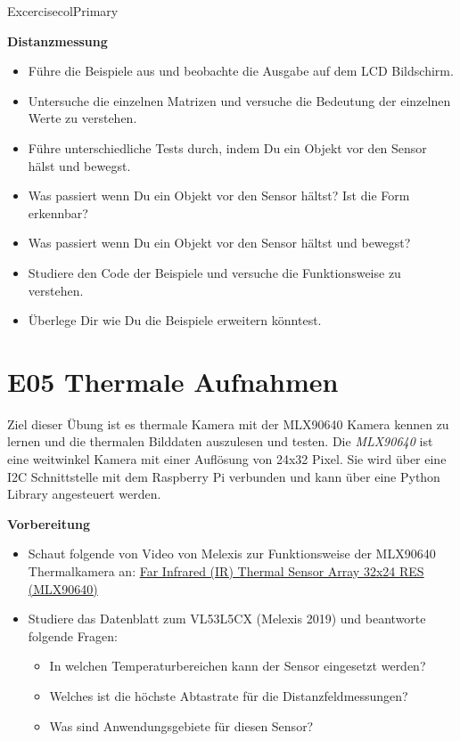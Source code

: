 \documentclass[
  11pt,
  a4paper,
  oneside, openany  ,captions=tableheading
]{scrbook}
\providecommand{\tightlist}{%
  \setlength{\itemsep}{0pt}\setlength{\parskip}{0pt}}
\theoremstyle{remark}
\begin{document}
\begin{boxtitle}{Excercise}{colPrimary}

\textbf{Distanzmessung}

\begin{itemize}
\tightlist
\item
  Führe die Beispiele aus und beobachte die Ausgabe auf dem LCD
  Bildschirm.
\item
  Untersuche die einzelnen Matrizen und versuche die Bedeutung der
  einzelnen Werte zu verstehen.
\item
  Führe unterschiedliche Tests durch, indem Du ein Objekt vor den Sensor
  hälst und bewegst.
\item
  Was passiert wenn Du ein Objekt vor den Sensor hältst? Ist die Form
  erkennbar?
\item
  Was passiert wenn Du ein Objekt vor den Sensor hältst und bewegst?
\item
  Studiere den Code der Beispiele und versuche die Funktionsweise zu
  verstehen.
\item
  Überlege Dir wie Du die Beispiele erweitern könntest.
\end{itemize}

\end{boxtitle}

\chapter*{E05 Thermale Aufnahmen}\label{e05-thermale-aufnahmen}


Ziel dieser Übung ist es thermale Kamera mit der MLX90640 Kamera kennen
zu lernen und die thermalen Bilddaten auszulesen und testen. Die
\emph{MLX90640} ist eine weitwinkel Kamera mit einer Auflösung von 24x32
Pixel. Sie wird über eine I2C Schnittstelle mit dem Raspberry Pi
verbunden und kann über eine Python Library angesteuert werden.

\textbf{Vorbereitung}

\begin{itemize}
\tightlist
\item
  Schaut folgende von Video von Melexis zur Funktionsweise der MLX90640
  Thermalkamera an:
  \href{https://www.youtube.com/embed/WSZ3GGDusTk?si=WTfxZ3m2axljCwDG}{Far
  Infrared (IR) Thermal Sensor Array 32x24 RES (MLX90640)}
\item
  Studiere das Datenblatt zum VL53L5CX (Melexis 2019) und beantworte
  folgende Fragen:

  \begin{itemize}
  \tightlist
  \item
    In welchen Temperaturbereichen kann der Sensor eingesetzt werden?
  \item
    Welches ist die höchste Abtastrate für die Distanzfeldmessungen?
  \item
    Was sind Anwendungsgebiete für diesen Sensor?
  \end{itemize}
\end{itemize}
\end{document}
